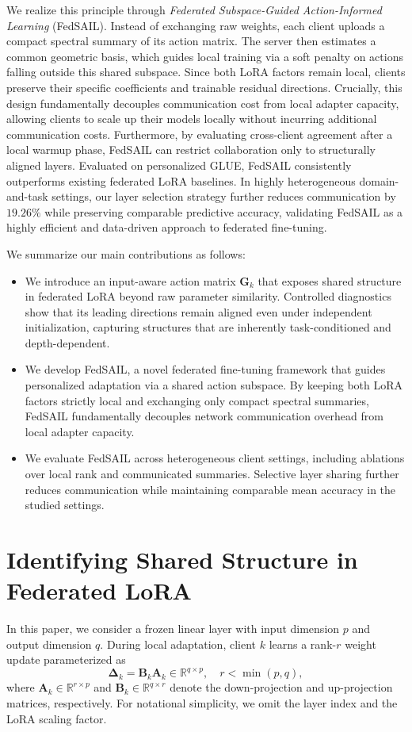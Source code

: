 \documentclass[11pt,letterpaper]{article}
\newcommand{\R}{\mathbb{R}}
\newcommand{\bA}{\mathbf{A}}
\newcommand{\bB}{\mathbf{B}}
\newcommand{\bG}{\mathbf{G}}
\newcommand{\bDelta}{\boldsymbol{\Delta}}
\begin{document}
We realize this principle through \emph{Federated Subspace-Guided Action-Informed Learning} (FedSAIL). Instead of exchanging raw weights, each client uploads a compact spectral summary of its action matrix. The server then estimates a common geometric basis, which guides local training via a soft penalty on actions falling outside this shared subspace. Since both LoRA factors remain local, clients preserve their specific coefficients and trainable residual directions. Crucially, this design fundamentally decouples communication cost from local adapter capacity, allowing clients to scale up their models locally without incurring additional communication costs. Furthermore, by evaluating cross-client agreement after a local warmup phase, FedSAIL can restrict collaboration only to structurally aligned layers. Evaluated on personalized GLUE, FedSAIL consistently outperforms existing federated LoRA baselines. In highly heterogeneous domain-and-task settings, our layer selection strategy further reduces communication by $19.26\%$ while preserving comparable predictive accuracy, validating FedSAIL as a highly efficient and data-driven approach to federated fine-tuning.


We summarize our main contributions as follows:
\begin{itemize}
	\item We introduce an input-aware action matrix $\bG_k$ that exposes shared structure in federated LoRA beyond raw parameter similarity. Controlled diagnostics show that its leading directions remain aligned even under independent initialization, capturing structures that are inherently task-conditioned and depth-dependent.
	\item We develop FedSAIL, a novel federated fine-tuning framework that guides personalized adaptation via a shared action subspace. By keeping both LoRA factors strictly local and exchanging only compact spectral summaries, FedSAIL fundamentally decouples network communication overhead from local adapter capacity.
	\item We evaluate FedSAIL across heterogeneous client settings, including ablations over local rank and communicated summaries. Selective layer sharing further reduces communication while maintaining comparable mean accuracy in the studied settings.
\end{itemize}


\section{Identifying Shared Structure in Federated LoRA}\label{sec:what-to-share}
In this paper, we consider a frozen linear layer with input dimension $p$ and output dimension $q$. During local adaptation, client $k$ learns a rank-$r$ weight update parameterized as
\begin{equation}
    \bDelta_k=\bB_k\bA_k\in\R^{q\times p},\quad r<\min(p, q),
\end{equation}
where $\bA_k\in\R^{r\times p}$ and $\bB_k\in\R^{q\times r}$ denote the down-projection and up-projection matrices, respectively. For notational simplicity, we omit the layer index and the LoRA scaling factor.
\end{document}
